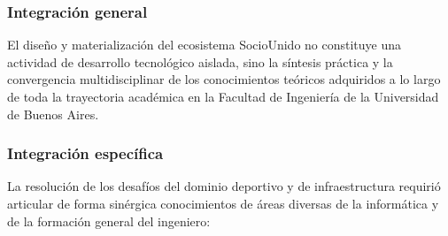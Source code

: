 \subsubsection{Integración general}
El diseño y materialización del ecosistema SocioUnido no constituye una actividad de desarrollo tecnológico aislada, sino la síntesis práctica y la convergencia multidisciplinar de los conocimientos teóricos adquiridos a lo largo de toda la trayectoria académica en la Facultad de Ingeniería de la Universidad de Buenos Aires.

\subsubsection{Integración específica}
La resolución de los desafíos del dominio deportivo y de infraestructura requirió articular de forma sinérgica conocimientos de áreas diversas de la informática y de la formación general del ingeniero:

